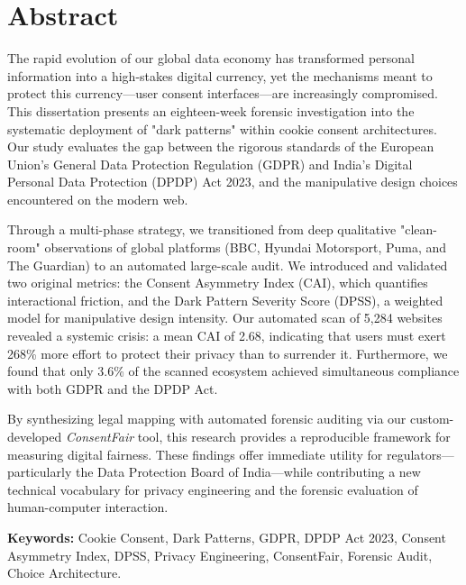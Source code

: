 \documentclass[12pt,a4paper]{report}
\begin{document}
\chapter*{Abstract}

The rapid evolution of our global data economy has transformed personal information into a high-stakes digital currency, yet the mechanisms meant to protect this currency—user consent interfaces—are increasingly compromised. This dissertation presents an eighteen-week forensic investigation into the systematic deployment of "dark patterns" within cookie consent architectures. Our study evaluates the gap between the rigorous standards of the European Union’s General Data Protection Regulation (GDPR) and India’s Digital Personal Data Protection (DPDP) Act 2023, and the manipulative design choices encountered on the modern web.

Through a multi-phase strategy, we transitioned from deep qualitative "clean-room" observations of global platforms (BBC, Hyundai Motorsport, Puma, and The Guardian) to an automated large-scale audit. We introduced and validated two original metrics: the Consent Asymmetry Index (CAI), which quantifies interactional friction, and the Dark Pattern Severity Score (DPSS), a weighted model for manipulative design intensity. Our automated scan of 5,284 websites revealed a systemic crisis: a mean CAI of 2.68, indicating that users must exert 268\% more effort to protect their privacy than to surrender it. Furthermore, we found that only 3.6\% of the scanned ecosystem achieved simultaneous compliance with both GDPR and the DPDP Act.

By synthesizing legal mapping with automated forensic auditing via our custom-developed \textit{ConsentFair} tool, this research provides a reproducible framework for measuring digital fairness. These findings offer immediate utility for regulators—particularly the Data Protection Board of India—while contributing a new technical vocabulary for privacy engineering and the forensic evaluation of human-computer interaction.

\medskip
\noindent\textbf{Keywords:} Cookie Consent, Dark Patterns, GDPR, DPDP Act 2023, Consent Asymmetry Index, DPSS, Privacy Engineering, ConsentFair, Forensic Audit, Choice Architecture.

\newpage
\end{document}
